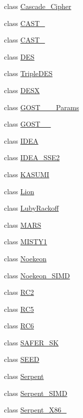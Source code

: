 \begin{DoxyCompactItemize}
\item 
class \hyperlink{classBotan_1_1Cascade__Cipher}{Cascade\-\_\-\-Cipher}
\item 
class \hyperlink{classBotan_1_1CAST__128}{C\-A\-S\-T\-\_}
\item 
class \hyperlink{classBotan_1_1CAST__256}{C\-A\-S\-T\-\_}
\item 
class \hyperlink{classBotan_1_1DES}{D\-E\-S}
\item 
class \hyperlink{classBotan_1_1TripleDES}{Triple\-D\-E\-S}
\item 
class \hyperlink{classBotan_1_1DESX}{D\-E\-S\-X}
\item 
class \hyperlink{classBotan_1_1GOST__28147__89__Params}{G\-O\-S\-T\-\_\-\_\-\_\-\-Params}
\item 
class \hyperlink{classBotan_1_1GOST__28147__89}{G\-O\-S\-T\-\_\-\_}
\item 
class \hyperlink{classBotan_1_1IDEA}{I\-D\-E\-A}
\item 
class \hyperlink{classBotan_1_1IDEA__SSE2}{I\-D\-E\-A\-\_\-\-S\-S\-E2}
\item 
class \hyperlink{classBotan_1_1KASUMI}{K\-A\-S\-U\-M\-I}
\item 
class \hyperlink{classBotan_1_1Lion}{Lion}
\item 
class \hyperlink{classBotan_1_1LubyRackoff}{Luby\-Rackoff}
\item 
class \hyperlink{classBotan_1_1MARS}{M\-A\-R\-S}
\item 
class \hyperlink{classBotan_1_1MISTY1}{M\-I\-S\-T\-Y1}
\item 
class \hyperlink{classBotan_1_1Noekeon}{Noekeon}
\item 
class \hyperlink{classBotan_1_1Noekeon__SIMD}{Noekeon\-\_\-\-S\-I\-M\-D}
\item 
class \hyperlink{classBotan_1_1RC2}{R\-C2}
\item 
class \hyperlink{classBotan_1_1RC5}{R\-C5}
\item 
class \hyperlink{classBotan_1_1RC6}{R\-C6}
\item 
class \hyperlink{classBotan_1_1SAFER__SK}{S\-A\-F\-E\-R\-\_\-\-S\-K}
\item 
class \hyperlink{classBotan_1_1SEED}{S\-E\-E\-D}
\item 
class \hyperlink{classBotan_1_1Serpent}{Serpent}
\item 
class \hyperlink{classBotan_1_1Serpent__SIMD}{Serpent\-\_\-\-S\-I\-M\-D}
\item 
class \hyperlink{classBotan_1_1Serpent__X86__32}{Serpent\-\_\-\-X86\-\_}

\end{DoxyCompactItemize}
